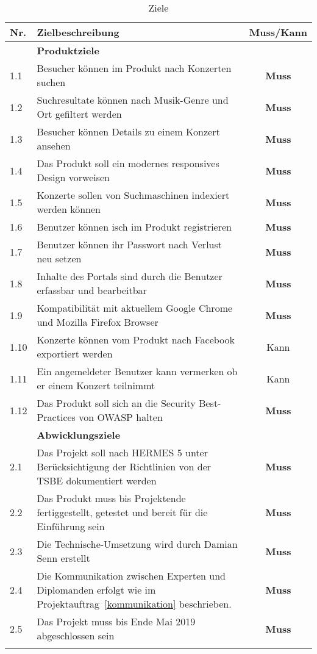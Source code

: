 \begin{longtable}[]{@{}lp{10.5cm}c@{}}
  \toprule
  Nr.  & Zielbeschreibung                                                                                                                 & Muss/Kann\tabularnewline
  \toprule
       & \textbf{Produktziele}\tabularnewline
  \midrule
  1.1  & Besucher können im Produkt nach Konzerten suchen                                                                                 & \textbf{Muss}\tabularnewline
  1.2  & Suchresultate können nach Musik-Genre und Ort gefiltert werden                                                                   & \textbf{Muss}\tabularnewline
  1.3  & Besucher können Details zu einem Konzert ansehen                                                                                 & \textbf{Muss}\tabularnewline
  1.4  & Das Produkt soll ein modernes responsives Design vorweisen                                                                       & \textbf{Muss}\tabularnewline
  1.5  & Konzerte sollen von Suchmaschinen indexiert werden können                                                                        & \textbf{Muss}\tabularnewline
  1.6  & Benutzer können isch im Produkt registrieren                                                                                     & \textbf{Muss}\tabularnewline
  1.7  & Benutzer können ihr Passwort nach Verlust neu setzen                                                                             & \textbf{Muss}\tabularnewline
  1.8  & Inhalte des Portals sind durch die Benutzer erfassbar und bearbeitbar                                                            & \textbf{Muss}\tabularnewline
  1.9  & Kompatibilität mit aktuellem Google Chrome und Mozilla Firefox Browser                                                           & \textbf{Muss}\tabularnewline
  1.10 & Konzerte können vom Produkt nach Facebook exportiert werden                                                                      & Kann\tabularnewline
  1.11 & Ein angemeldeter Benutzer kann vermerken ob er einem Konzert teilnimmt                                                           & Kann\tabularnewline
  1.12 & Das Produkt soll sich an die Security Best-Practices von OWASP halten                                                            & \textbf{Muss}\tabularnewline
  \toprule
       & \textbf{Abwicklungsziele}\tabularnewline
  \midrule
  2.1  & Das Projekt soll nach HERMES 5 unter Berücksichtigung der Richtlinien von der TSBE dokumentiert werden & \textbf{Muss}\tabularnewline
  2.2  & Das Produkt muss bis Projektende fertiggestellt, getestet und bereit für die Einführung sein     & \textbf{Muss}\tabularnewline
  2.3  & Die Technische-Umsetzung wird durch Damian Senn erstellt                                                                         & \textbf{Muss}\tabularnewline
  2.4  & Die Kommunikation zwischen Experten und Diplomanden erfolgt wie im Projektauftrag~\ref{kommunikation} beschrieben. & \textbf{Muss}\tabularnewline
  2.5  & Das Projekt muss bis Ende Mai 2019 abgeschlossen sein                                                                            & \textbf{Muss}\tabularnewline
  \bottomrule
  \caption{Ziele}
\end{longtable}
